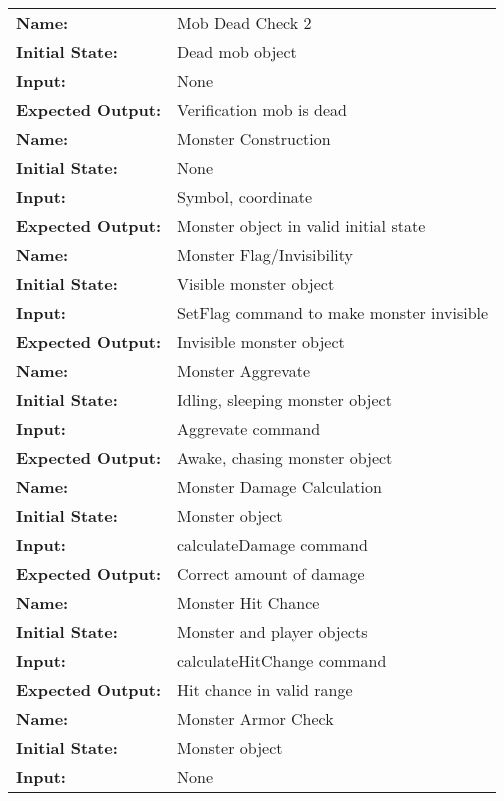 \documentclass[12pt, titlepage]{article}
\begin{document}
\begin{center}
\begin{longtable}{ l | p{10cm} }
				\hline
				\rule{0pt}{2em}\textbf{Name:} & Mob Dead Check 2\\
				\textbf{Initial State:} & Dead mob object\\
				\textbf{Input:} & None\\
				\textbf{Expected Output:} & Verification mob is dead\\[1em]
				\hline
				\rule{0pt}{2em}\textbf{Name:} & Monster Construction\\
				\textbf{Initial State:} & None\\
				\textbf{Input:} & Symbol, coordinate\\
				\textbf{Expected Output:} & Monster object in valid initial state\\[1em]
				\hline
				\rule{0pt}{2em}\textbf{Name:} & Monster Flag/Invisibility\\
				\textbf{Initial State:} & Visible monster object\\
				\textbf{Input:} & SetFlag command to make monster invisible\\
				\textbf{Expected Output:} & Invisible monster object\\[1em]
				\hline
				\rule{0pt}{2em}\textbf{Name:} & Monster Aggrevate\\
				\textbf{Initial State:} & Idling, sleeping monster object\\
				\textbf{Input:} & Aggrevate command\\
				\textbf{Expected Output:} & Awake, chasing monster object\\[1em]
				\hline
				\rule{0pt}{2em}\textbf{Name:} & Monster Damage Calculation\\
				\textbf{Initial State:} & Monster object\\
				\textbf{Input:} & calculateDamage command\\
				\textbf{Expected Output:} & Correct amount of damage\\[1em]
				\hline
				\rule{0pt}{2em}\textbf{Name:} & Monster Hit Chance\\
				\textbf{Initial State:} & Monster and player objects\\
				\textbf{Input:} & calculateHitChange command\\
				\textbf{Expected Output:} & Hit chance in valid range\\[1em]
				\hline
				\rule{0pt}{2em}\textbf{Name:} & Monster Armor Check\\
				\textbf{Initial State:} & Monster object\\
				\textbf{Input:} & None\\

\end{longtable}
\end{center}
\end{document}
